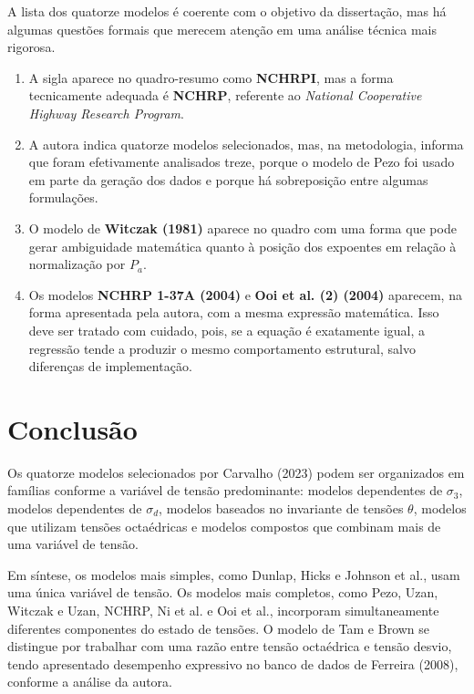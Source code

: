 \documentclass[12pt,a4paper]{article}
\begin{document}
A lista dos quatorze modelos é coerente com o objetivo da dissertação, mas há algumas questões formais que merecem atenção em uma análise técnica mais rigorosa.

\begin{enumerate}
    \item A sigla aparece no quadro-resumo como \textbf{NCHRPI}, mas a forma tecnicamente adequada é \textbf{NCHRP}, referente ao \textit{National Cooperative Highway Research Program}.
    
    \item A autora indica quatorze modelos selecionados, mas, na metodologia, informa que foram efetivamente analisados treze, porque o modelo de Pezo foi usado em parte da geração dos dados e porque há sobreposição entre algumas formulações.
    
    \item O modelo de \textbf{Witczak (1981)} aparece no quadro com uma forma que pode gerar ambiguidade matemática quanto à posição dos expoentes em relação à normalização por $P_a$.
    
    \item Os modelos \textbf{NCHRP 1-37A (2004)} e \textbf{Ooi et al. (2) (2004)} aparecem, na forma apresentada pela autora, com a mesma expressão matemática. Isso deve ser tratado com cuidado, pois, se a equação é exatamente igual, a regressão tende a produzir o mesmo comportamento estrutural, salvo diferenças de implementação.
\end{enumerate}

\section*{Conclusão}

Os quatorze modelos selecionados por Carvalho (2023) podem ser organizados em famílias conforme a variável de tensão predominante: modelos dependentes de $\sigma_3$, modelos dependentes de $\sigma_d$, modelos baseados no invariante de tensões $\theta$, modelos que utilizam tensões octaédricas e modelos compostos que combinam mais de uma variável de tensão.

Em síntese, os modelos mais simples, como Dunlap, Hicks e Johnson et al., usam uma única variável de tensão. Os modelos mais completos, como Pezo, Uzan, Witczak e Uzan, NCHRP, Ni et al. e Ooi et al., incorporam simultaneamente diferentes componentes do estado de tensões. O modelo de Tam e Brown se distingue por trabalhar com uma razão entre tensão octaédrica e tensão desvio, tendo apresentado desempenho expressivo no banco de dados de Ferreira (2008), conforme a análise da autora.
\end{document}
